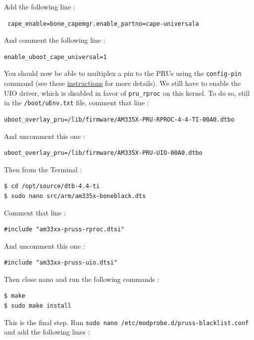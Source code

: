 \documentclass[]{report}
\begin{document}
\noindent Add the following line :

\begin{verbatim}
 cape_enable=bone_capemgr.enable_partno=cape-universala
\end{verbatim}

\noindent And comment the following line :

\begin{verbatim}
enable_uboot_cape_universal=1
\end{verbatim}

You should now be able to multiplex a pin to the PRUs using the
\texttt{config-pin} command (see these
\href{Documentation/pins.md}{instructions} for more details). We still
have to enable the UIO driver, which is disabled in favor of
\texttt{pru\_rproc} on this kernel. To do so, still in the
\texttt{/boot/uEnv.txt} file, comment that line :

\begin{verbatim}
uboot_overlay_pru=/lib/firmware/AM335X-PRU-RPROC-4-4-TI-00A0.dtbo
\end{verbatim}

\noindent And uncomment this one :

\begin{verbatim}
uboot_overlay_pru=/lib/firmware/AM335X-PRU-UIO-00A0.dtbo
\end{verbatim}

\noindent Then from the Terminal :

\begin{verbatim}
$ cd /opt/source/dtb-4.4-ti
$ sudo nano src/arm/am335x-boneblack.dts
\end{verbatim}

\noindent Comment that line :

\begin{verbatim}
#include "am33xx-pruss-rproc.dtsi"
\end{verbatim}

\noindent And uncomment this one :

\begin{verbatim}
#include "am33xx-pruss-uio.dtsi"
\end{verbatim}

\noindent Then close nano and run the following commands :

\begin{verbatim}
$ make
$ sudo make install
\end{verbatim}

\noindent This is the final step. Run
\texttt{sudo\ nano\ /etc/modprobe.d/pruss-blacklist.conf} and add the
following lines :
\end{document}
